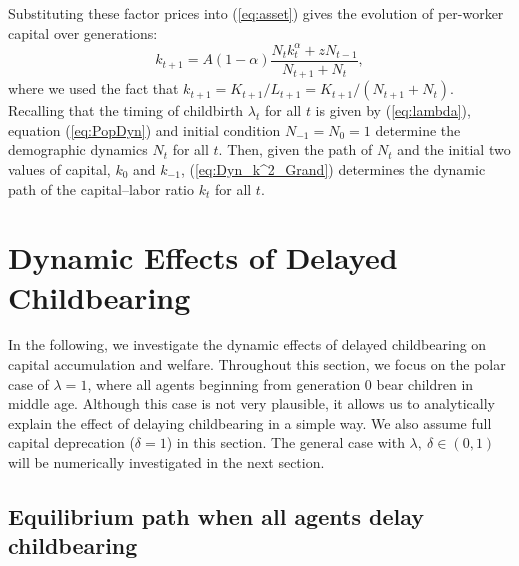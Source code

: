\documentclass{MBE}%
\begin{document}
{Substituting these factor prices into (\ref{eq:asset}) gives the evolution of
per-worker capital over generations:
\begin{equation}
k_{t+1}=A\left(  1-\alpha\right)  \frac{N_{t}k_{t}^{\alpha}+zN_{t-1}  }{N_{t+1}+N_{t}}, \label{eq:Dyn_k^2_Grand}%
\end{equation}
where we used the fact that $k_{t+1}=K_{t+1}/L_{t+1}=K_{t+1}/(N_{t+1}+N_{t})$.
Recalling that the timing of childbirth $\lambda_{t}$ for all $t$ is given by
(\ref{eq:lambda}), equation (\ref{eq:PopDyn}) and initial condition
$N_{-1}=N_{0}=1$ determine the demographic dynamics $N_{t}$ for all $t$. Then,
given the path of $N_{t}$ and the initial two values of capital, $k_{0}$ and
$k_{-1}$, (\ref{eq:Dyn_k^2_Grand}) determines the dynamic path of the
capital--labor ratio $k_{t}$ for all $t$.

\section{Dynamic Effects of Delayed Childbearing\label{sec:Dyn}}

In the following, we investigate the dynamic effects of delayed childbearing
on capital accumulation and welfare. Throughout this section, we focus on the
polar case of $\lambda=1$, where all agents beginning from generation 0 bear
children in middle age. Although this case is not very plausible, it allows us
to analytically explain the effect of delaying childbearing in a simple way.
We also assume full capital deprecation ($\delta=1$) in this section. The
general case with $\lambda,\ \delta\in\left(  0,1\right)  $ will be
numerically investigated in the next section.

\subsection{ Equilibrium path when all agents delay childbearing
\label{subsec:Dyn_Property}}

}
\end{document}
